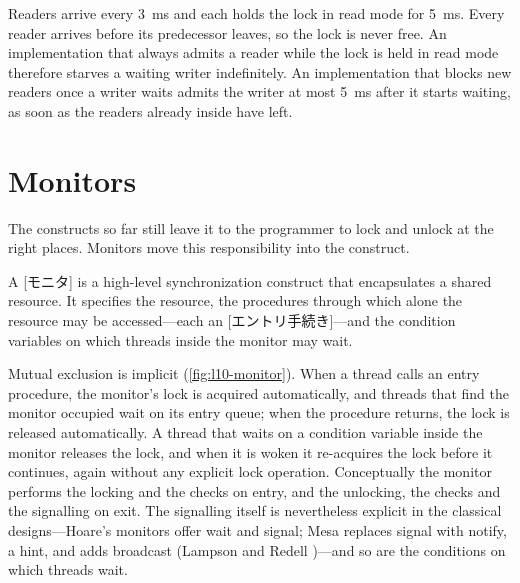 \documentclass[../main.tex]{subfiles}
\begin{document}
\begin{example}
  Readers arrive every \SI{3}{\milli\second} and each holds the lock in
  read mode for \SI{5}{\milli\second}.  Every reader arrives before its
  predecessor leaves, so the lock is never free.  An implementation that
  always admits a reader while the lock is held in read mode therefore
  starves a waiting writer indefinitely.  An implementation that blocks new
  readers once a writer waits admits the writer at most
  \SI{5}{\milli\second} after it starts waiting, as soon as the readers
  already inside have left.
\end{example}

\section{Monitors}
\label{sec:l10-monitor}

The constructs so far still leave it to the programmer to lock and unlock
at the right places.
Monitors move this responsibility into the construct.

\begin{definition}[Monitor]
  A [モニタ] is a high-level synchronization construct that
  encapsulates a shared resource.  It specifies the resource, the
  procedures through which alone the resource may be accessed---each an
  [エントリ手続き]---and the condition variables on
  which threads inside the monitor may wait.
\end{definition}

Mutual exclusion is implicit (\cref{fig:l10-monitor}).  When a thread calls
an entry procedure, the monitor's lock is acquired automatically, and
threads that find the monitor occupied wait on its entry queue; when the
procedure returns, the lock is released automatically.  A thread that waits
on a condition variable inside the monitor releases the lock, and when it
is woken it re-acquires the lock before it continues, again without any
explicit lock operation.  Conceptually the monitor performs the locking
and the checks on entry, and the unlocking, the checks and the signalling
on exit.  The signalling itself is nevertheless explicit in the classical
designs---Hoare's monitors offer wait and signal; Mesa replaces signal with
notify, a hint, and adds broadcast (Lampson and Redell
\cite{lampson1980})---and so are the conditions on which threads
wait.
\end{document}
